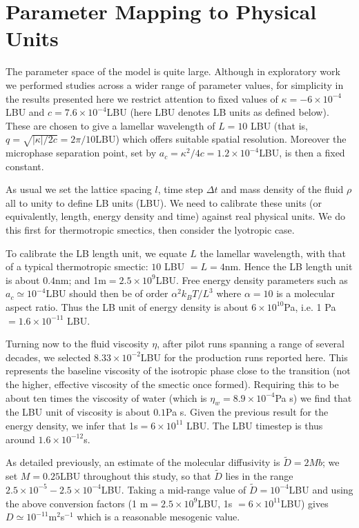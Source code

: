 \documentclass[8.5pt,twoside,twocolumn]{article}
\begin{document}
\section{Parameter Mapping to Physical Units}
\label{parametermap}

The parameter space of the model is quite large. Although in exploratory work we performed studies across a wider range of parameter values, for simplicity in the results presented here we restrict attention to fixed values of $\kappa = -6\times 10^{-4}$LBU and $c = 7.6\times 10^{-4}$LBU (here LBU denotes LB units as defined below). These are chosen to give a lamellar wavelength of $L = 10$ LBU (that is, $q = \sqrt{|\kappa|/2c} = 2\pi/10$LBU) which offers suitable spatial resolution. Moreover the microphase separation point, set by $a_c = \kappa^2/4c = 1.2\times 10^{-4}$LBU, is then a fixed constant. 

As usual we set the lattice spacing $l$, time step $\Delta t$ and mass density of the fluid $\rho$ all to unity to define LB units (LBU). We need to calibrate these units (or equivalently, length, energy density and time) against real physical units. We do this first for thermotropic smectics, then consider the lyotropic case.

To calibrate the LB length unit, we equate $L$ the lamellar wavelength, with that of a typical thermotropic smectic: $10$ LBU $= L = 4$nm. Hence the LB length unit is about $0.4$nm; and 1m$= 2.5\times 10^{9}$LBU. Free energy density parameters such as $a_c \simeq 10^{-4}$LBU should then be of order $\alpha^2k_BT/L^3$ where $\alpha =10$ is a molecular aspect ratio. Thus the LB unit of energy density is about $6\times 10^{10}$Pa, i.e. 1 Pa$= 1.6 \times 10^{-11}$ LBU.  

Turning now to the fluid viscosity $\eta$, after pilot runs spanning a range of several decades, we selected $8.33\times 10^{-2}$LBU for the production runs reported here. This represents the baseline viscosity of the isotropic phase close to the transition (not the higher, effective viscosity of the smectic once formed). Requiring this to be about ten times the viscosity of water (which is $\eta_w = 8.9\times 10^{-4}$Pa s) we find that the LBU unit of viscosity is about $0.1$Pa s. Given the previous result for the energy density, we infer that 1s$= 6\times 10^{11}$ LBU. The LBU timestep is thus around $1.6\times 10^{-12}$s. 

As detailed previously, an estimate of the molecular diffusivity is $\tilde D = 2Mb$; we set $M = 0.25$LBU throughout this study, so that $\tilde D$ lies in the range $2.5\times 10^{-5} - 2.5\times 10^{-4}$LBU. Taking a mid-range value of  $\tilde D = 10^{-4}$LBU and using the above conversion factors (1 m$= 2.5\times 10^9$LBU, 1s $= 6\times 10^{11}$LBU) gives $D\simeq 10^{-11}$m$^2$s$^{-1}$ which is a reasonable mesogenic value.
\end{document}
